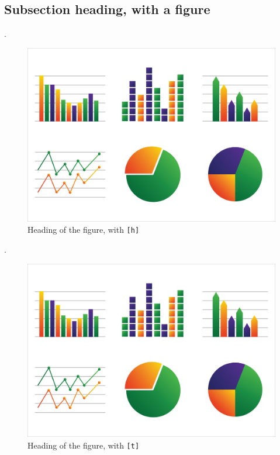 \documentclass[12pt]{../bppaper}
\begin{document}
\subsection{Subsection heading, with a figure}

\blindtext \cite{knuth:1984}.
\begin{figure}[h!]
\centering
\caption{Heading of the figure, with \texttt{[h]}}
\includegraphics[width=0.8\linewidth]{graph}
\end{figure}
\cite{latex:companion}. \blindtext 

\blindtext
\begin{figure}[t]
\centering
\caption{Heading of the figure, with \texttt{[t]}}
\includegraphics[width=0.8\linewidth]{graph}
\end{figure}
\blindtext
\end{document}
